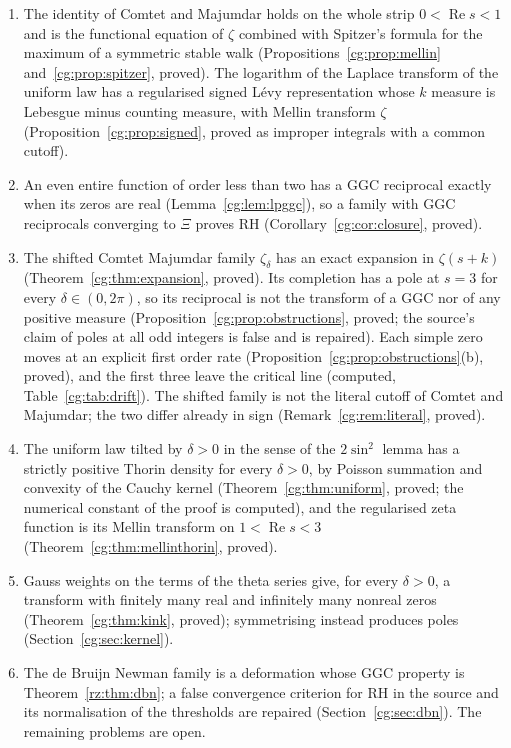 \begin{enumerate}
\item The identity of Comtet and Majumdar holds on the whole strip $0<\operatorname{Re}s<1$ and is the functional equation of $\zeta$ combined with Spitzer's formula for the maximum of a symmetric stable walk (Propositions~\ref{cg:prop:mellin} and~\ref{cg:prop:spitzer}, proved). The logarithm of the Laplace transform of the uniform law has a regularised signed L\'evy representation whose $k$ measure is Lebesgue minus counting measure, with Mellin transform $\zeta$ (Proposition~\ref{cg:prop:signed}, proved as improper integrals with a common cutoff).
\item An even entire function of order less than two has a GGC reciprocal exactly when its zeros are real (Lemma~\ref{cg:lem:lpggc}), so a family with GGC reciprocals converging to $\Xi$ proves RH (Corollary~\ref{cg:cor:closure}, proved).
\item The shifted Comtet Majumdar family $\zeta_\delta$ has an exact expansion in $\zeta(s+k)$ (Theorem~\ref{cg:thm:expansion}, proved). Its completion has a pole at $s=3$ for every $\delta\in(0,2\pi)$, so its reciprocal is not the transform of a GGC nor of any positive measure (Proposition~\ref{cg:prop:obstructions}, proved; the source's claim of poles at all odd integers is false and is repaired). Each simple zero moves at an explicit first order rate (Proposition~\ref{cg:prop:obstructions}(b), proved), and the first three leave the critical line (computed, Table~\ref{cg:tab:drift}). The shifted family is not the literal cutoff of Comtet and Majumdar; the two differ already in sign (Remark~\ref{cg:rem:literal}, proved).
\item The uniform law tilted by $\delta>0$ in the sense of the $2\sin^2$ lemma has a strictly positive Thorin density for every $\delta>0$, by Poisson summation and convexity of the Cauchy kernel (Theorem~\ref{cg:thm:uniform}, proved; the numerical constant of the proof is computed), and the regularised zeta function is its Mellin transform on $1<\operatorname{Re}s<3$ (Theorem~\ref{cg:thm:mellinthorin}, proved).
\item Gauss weights on the terms of the theta series give, for every $\delta>0$, a transform with finitely many real and infinitely many nonreal zeros (Theorem~\ref{cg:thm:kink}, proved); symmetrising instead produces poles (Section~\ref{cg:sec:kernel}).
\item The de Bruijn Newman family is a deformation whose GGC property is Theorem~\ref{rz:thm:dbn}; a false convergence criterion for RH in the source and its normalisation of the thresholds are repaired (Section~\ref{cg:sec:dbn}). The remaining problems are open.
\end{enumerate}
